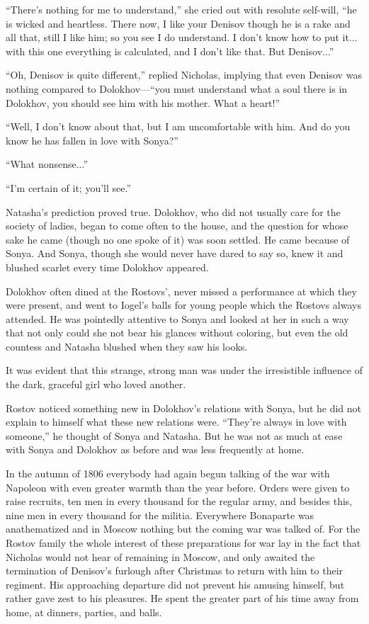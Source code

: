``There's nothing for me to understand,'' she cried out with
resolute self-will, ``he is wicked and heartless. There now, I
like your Denisov though he is a rake and all that, still I like
him; so you see I do understand. I don't know how to put
it... with this one everything is calculated, and I don't like
that. But Denisov...''

``Oh, Denisov is quite different,'' replied Nicholas, implying
that even Denisov was nothing compared to Dolokhov---``you must
understand what a soul there is in Dolokhov, you should see him
with his mother. What a heart!''

``Well, I don't know about that, but I am uncomfortable with
him. And do you know he has fallen in love with Sonya?''

``What nonsense...''

``I'm certain of it; you'll see.''

Natasha's prediction proved true. Dolokhov, who did not usually
care for the society of ladies, began to come often to the house,
and the question for whose sake he came (though no one spoke of
it) was soon settled. He came because of Sonya. And Sonya, though
she would never have dared to say so, knew it and blushed scarlet
every time Dolokhov appeared.

Dolokhov often dined at the Rostovs', never missed a performance
at which they were present, and went to Iogel's balls for young
people which the Rostovs always attended. He was pointedly
attentive to Sonya and looked at her in such a way that not only
could she not bear his glances without coloring, but even the old
countess and Natasha blushed when they saw his looks.

It was evident that this strange, strong man was under the
irresistible influence of the dark, graceful girl who loved
another.

Rostov noticed something new in Dolokhov's relations with Sonya,
but he did not explain to himself what these new relations
were. ``They're always in love with someone,'' he thought of
Sonya and Natasha. But he was not as much at ease with Sonya and
Dolokhov as before and was less frequently at home.

In the autumn of 1806 everybody had again begun talking of the
war with Napoleon with even greater warmth than the year
before. Orders were given to raise recruits, ten men in every
thousand for the regular army, and besides this, nine men in
every thousand for the militia. Everywhere Bonaparte was
anathematized and in Moscow nothing but the coming war was talked
of. For the Rostov family the whole interest of these
preparations for war lay in the fact that Nicholas would not hear
of remaining in Moscow, and only awaited the termination of
Denisov's furlough after Christmas to return with him to their
regiment. His approaching departure did not prevent his amusing
himself, but rather gave zest to his pleasures. He spent the
greater part of his time away from home, at dinners, parties, and
balls.

